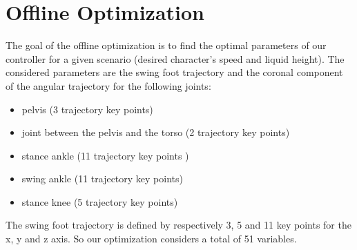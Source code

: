 \documentclass[conference]{acmsiggraph}
\begin{document}
\section{Offline Optimization}
\label{sec:optimisation}

The goal of the offline optimization is to find the optimal parameters of our controller for a given scenario (desired character's speed and liquid height). The considered parameters are the swing foot trajectory and the coronal component of the angular trajectory for the following joints:
\begin{itemize}[noitemsep,nolistsep]
\item pelvis (3 trajectory key points)
\item joint between the pelvis and the torso (2 trajectory key points)
\item stance ankle (11 trajectory key points )
\item swing ankle (11 trajectory key points)
\item stance knee (5 trajectory key points)
\end{itemize}
The swing foot trajectory is defined by respectively 3, 5 and 11 key points for the x, y and z axis. So our optimization considers a total of 51 variables.
\end{document}

